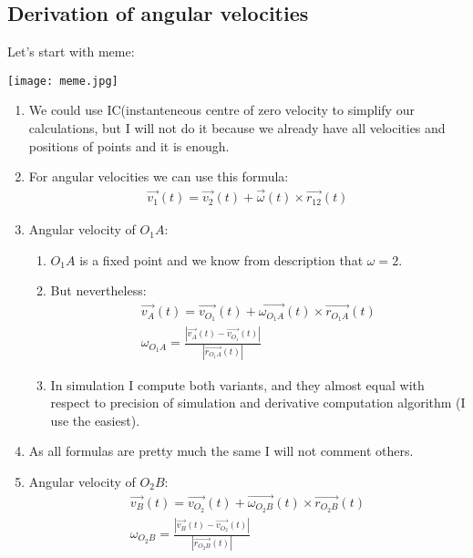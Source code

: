 \subsection{Derivation of angular velocities}

Let's start with meme:

\texttt{[image: meme.jpg]}

\begin{enumerate}
    \item We could use IC(instanteneous centre of zero velocity to simplify our calculations,
          but I will not do it because we already have all velocities and positions of points and it is enough.
    \item For angular velocities we can use this formula:
          \begin{align}
              \vec{v_1}(t) = \vec{v_2}(t) + \vec{\omega}(t) \times \vec{r_{12}}(t)
          \end{align}
    \item Angular velocity of $O_1A$:
          \begin{enumerate}
              \item $O_1A$ is a fixed point and we know from description that $\omega = 2$.
              \item But nevertheless:
                    \begin{align}
                        \vec{v_A}(t) = \vec{v_{O_1}}(t) + \vec{\omega_{O_1A}}(t) \times \vec{r_{O_1A}}(t) \\
                        \omega_{O_1A} = \frac{|\vec{v_A}(t) - \vec{v_{O_1}}(t)|}{|\vec{r_{O_1A}}(t)|}
                    \end{align}
              \item In simulation I compute both variants, and they almost equal
                    with respect to precision of simulation and derivative computation algorithm (I use the easiest).
          \end{enumerate}
    \item As all formulas are pretty much the same I will not comment others.
    \item Angular velocity of $O_2B$:
          \begin{align}
              \vec{v_B}(t) = \vec{v_{O_2}}(t) + \vec{\omega_{O_2B}}(t) \times \vec{r_{O_2B}}(t) \\
              \omega_{O_2B} = \frac{|\vec{v_B}(t) - \vec{v_{O_2}}(t)|}{|\vec{r_{O_2B}}(t)|}
          \end{align}

\end{enumerate}
